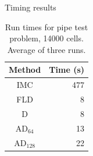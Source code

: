 \documentclass{beamer}
\begin{document}
\begin{frame}{Timing results}
  \begin{table}[htb]
    \centering
    \begin{tabular}{cr}
      Method & Time (s) \\ \hline
      IMC & 477 \\
      FLD & 8 \\
      D   & 8 \\
      AD$_{64}$ & 13 \\
      AD$_{128}$ & 22
    \end{tabular}
    \caption{Run times for pipe test problem, 14000 cells. Average of three
    runs.}
    \label{tab:pipeTiming}
  \end{table}
\end{frame}
\end{document}
